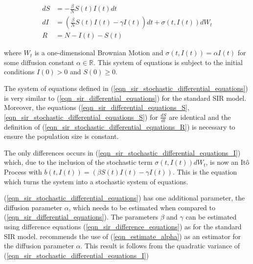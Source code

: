 \documentclass[11pt,a4paper]{article}
\theoremstyle{break}
\begin{document}
  \begin{subequations}\label{eqn_sir_stochastic_differential_equations}
    \begin{alignat}{2}
      dS&=-\frac\beta{N} S(t)I(t)dt\label{eqn_sir_stochastic_differential_equations_S}\\
      dI&=\left(\frac\beta{N} S(t)I(t)-\gamma I(t)\right)dt+\sigma(t,I(t))dW_t\label{eqn_sir_stochastic_differential_equations_I}\\
      R&=N-I(t)-S(t)\label{eqn_sir_stochastic_differential_equations_R}
    \end{alignat}
  \end{subequations}

  where $W_t$ is a one-dimensional Brownian Motion and $\sigma(t,I(t))=\alpha I(t)$ for some diffusion constant $\alpha\in\mathbb{R}$. This system of equations is subject to the initial conditions $I(0)>0$ and $S(0)\geq0$.

  \par The system of equations defined in (\ref{eqn_sir_stochastic_differential_equations}) is very similar to (\ref{eqn_sir_differential_equations}) for the standard SIR model. Moreover, the equations (\ref{eqn_sir_differential_equations_S},\ref{eqn_sir_stochastic_differential_equations_S}) for $\frac{dS}{dt}$ are identical and the definition of (\ref{eqn_sir_stochastic_differential_equations_R}) is necessary to ensure the population size is constant.

  \par The only differences occurs in (\ref{eqn_sir_stochastic_differential_equations_I}) which, due to the inclusion of the stochastic term $\sigma(t,I(t))dW_t$, is now an It\^o Process with $b(t,I(t))=(\beta S(t)I(t)-\gamma I(t))$. This is the equation which turns the system into a stochastic system of equations.

  \par (\ref{eqn_sir_stochastic_differential_equations}) has one additional parameter, the diffusion parameter $\alpha$, which needs to be estimated when compared to (\ref{eqn_sir_differential_equations}). The parameters $\beta$ and $\gamma$ can be estimated using difference equations (\ref{eqn_sir_difference_equations}) as for the standard SIR model. \cite[]{infectious_disease_spread_analysis_using_sdes} recommends the use of (\ref{eqn_estimate_alpha}) as an estimator for the diffusion parameter $\alpha$. This result is follows from the quadratic variance of (\ref{eqn_sir_stochastic_differential_equations_I})
\end{document}
